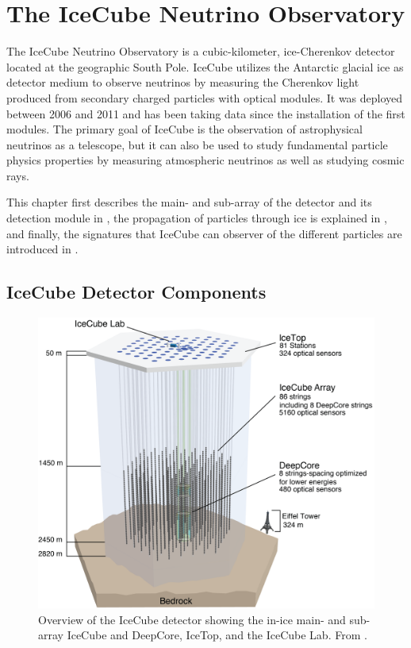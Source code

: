 \setchapterpreamble[u]{\margintoc}


\chapter{The IceCube Neutrino Observatory}


The IceCube Neutrino Observatory  is a cubic-kilometer, ice-Cherenkov detector located at the geographic South Pole. IceCube utilizes the Antarctic glacial ice as detector medium to observe neutrinos by measuring the Cherenkov light produced from secondary charged particles with optical modules. It was deployed between 2006 and 2011 and has been taking data since the installation of the first modules. The primary goal of IceCube is the observation of astrophysical neutrinos as a telescope, but it can also be used to study fundamental particle physics properties by measuring atmospheric neutrinos as well as studying cosmic rays.

This chapter first describes the main- and sub-array of the detector and its detection module in , the propagation of particles through ice is explained in , and finally, the signatures that IceCube can observer of the different particles are introduced in .


\section{IceCube Detector Components} 

\begin{figure}[h]
    \includegraphics{figures/icecube_deepcore/IceCubeArray_slim.png}
	\caption[IceCube overview]{Overview of the IceCube detector showing the in-ice main- and sub-array IceCube and DeepCore, IceTop, and the IceCube Lab. From \cite{2017JInst..12P3012A_Instrumentation_Systems}.}
\end{figure}


